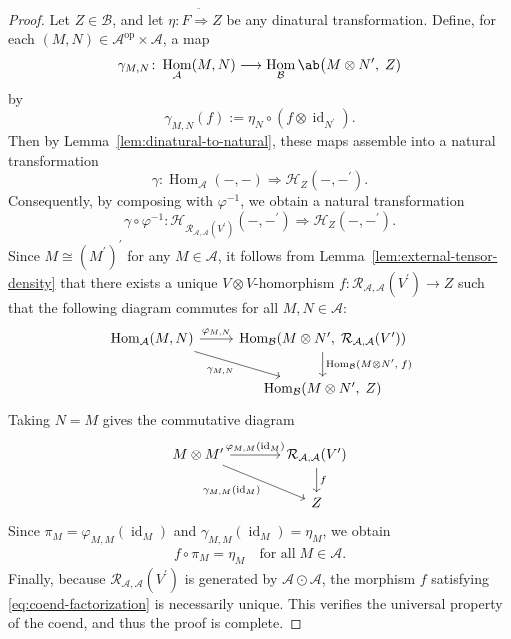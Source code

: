 \documentclass[12pt, english]{article}
\numberwithin{equation}{section}
\DeclareMathOperator{\Hom}{Hom}
\DeclareMathOperator{\id}{id}
\DeclareMathOperator{\opp}{op}
\theoremstyle{plain}
\theoremstyle{definition}
\theoremstyle{remark}
\begin{document}
\begin{proof}
		Let $Z \in \mathcal{B}$,  and let $\eta: F \ddot{ \Rightarrow } Z$ be any dinatural transformation.
		Define, for each $(M, N) \in \mathcal{A}^{\opp} \times \mathcal{A}$, a map
		\[
		\gamma_{M, N}\colon \Hom_{\mathcal{A}}(M, N) \longrightarrow \Hom_{\mathcal{B}} \ab\big(M \otimes N^\prime, \; Z)
		\]
		by
		\[
		\gamma_{M, N}(f) := \eta_N \circ (f \otimes \id_{N^\prime}).
		\]
		Then by Lemma~\ref{lem:dinatural-to-natural}, these maps assemble into a natural transformation
		\[
		\gamma \colon \Hom_{\mathcal{A}}(-, -) \Rightarrow \mathcal{H}_Z(-, -^\prime).
		\]
		Consequently, by composing with $\varphi^{-1}$,  we obtain a natural transformation
		\[
		\gamma \circ \varphi^{-1} \colon \mathcal{H}_{\mathcal{R}_{\mathcal{A}, \mathcal{A}}(V^\prime)}(-, -^\prime) \Rightarrow \mathcal{H}_Z(-, -^\prime).
		\]
		Since $M \cong (M^\prime)^\prime$ for any $M \in \mathcal{A}$, it follows from Lemma~\ref{lem:external-tensor-density} that there exists a unique  $V \otimes V$-homorphism $f \colon \mathcal{R}_{\mathcal{A}, \mathcal{A}}(V^\prime) \to Z $   such that the following diagram commutes for all
		$M, N \in \mathcal{A}$:
		\[
		\begin{tikzcd}
			\Hom_{\mathcal{A}}(M, N)
			\arrow[r, "{\varphi_{M, N}}"]
			\arrow[dr, "{\gamma_{M, N}}"']
			& \Hom_{\mathcal{B}}(M \otimes N^\prime, \; \mathcal{R}_{\mathcal{A}, \mathcal{A}}(V^\prime))
			\arrow[d, "{\Hom_{\mathcal{B}}(M \otimes N^\prime,  \; f)}"]
			\\
			& \Hom_{\mathcal{B}}(M\otimes N^\prime, \; Z)
		\end{tikzcd}
		\]
		Taking $N = M$ gives the commutative diagram
		\[
		\begin{tikzcd}[column sep=large, row sep=normal]
			M \otimes M^\prime
			\arrow[r, "{\varphi_{M, M}(\id_M)}"]
			\arrow[dr, "{\gamma_{M,M}(\id_M) }"']
			& \mathcal{R}_{\mathcal{A}, \mathcal{A}}(V^\prime)
			\arrow[d, "f"]
			\\
			& Z
		\end{tikzcd}
		\]
		Since $\pi_M = \varphi_{M, M}(\id_M) $ and $ \gamma_{M, M}(\id_M) = \eta_M $, we obtain
		\begin{align} \label{eq:coend-factorization}
			f \circ \pi_M = \eta_M \quad \text{for all} \; M \in \mathcal{A}.
		\end{align}
		Finally, because $ \mathcal{R}_{\mathcal{A}, \mathcal{A}}(V^\prime) $ is generated by $ \mathcal{A} \odot \mathcal{A} $,
		the morphism $f$ satisfying \eqref{eq:coend-factorization} is necessarily unique. This verifies the universal property of the coend, and thus the proof is complete.
		
	\end{proof}
	
\end{document}

